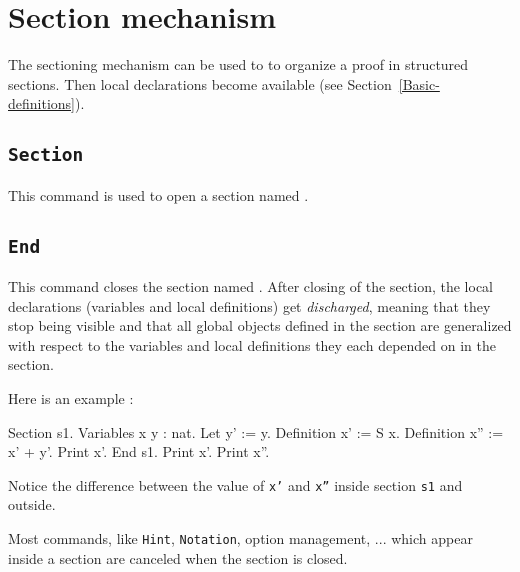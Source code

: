 \section{Section mechanism
\label{Section}}

The sectioning mechanism can be used to to organize a proof in
structured sections. Then local declarations become available (see
Section~\ref{Basic-definitions}).

\subsection{\tt Section {\ident}}

This command is used to open a section named {\ident}.


\subsection{\tt End {\ident}
}

This command closes the section named {\ident}. After closing of the
section, the local declarations (variables and local definitions) get
{\em discharged}, meaning that they stop being visible and that all
global objects defined in the section are generalized with respect to
the variables and local definitions they each depended on in the
section.


Here is an example :
\begin{coq_example}
Section s1.
Variables x y : nat.
Let y' := y.
Definition x' := S x.
Definition x'' := x' + y'.
Print x'.
End s1.
Print x'.
Print x''.
\end{coq_example}
Notice the difference between the value of {\tt x'} and {\tt x''}
inside section {\tt s1} and outside.

\begin{ErrMsgs}
\item {}
\end{ErrMsgs}

\begin{Remarks}
\item Most commands, like {\tt Hint}, {\tt Notation}, option management, ...
which appear inside a section are canceled when the
section is closed.

\end{Remarks}

